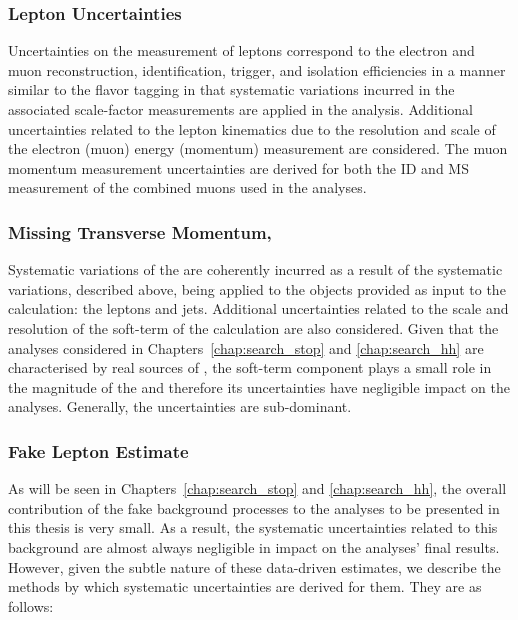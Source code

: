 \subsubsection{Lepton Uncertainties}
Uncertainties on the measurement of leptons correspond to the electron and muon reconstruction,
identification, trigger, and isolation efficiencies in a manner similar to the flavor tagging
in that systematic variations incurred in the associated scale-factor measurements are applied
in the analysis.
Additional uncertainties related to the lepton kinematics due to the resolution and scale of the
electron (muon) energy (momentum) measurement are considered.
The muon momentum measurement uncertainties are derived for both the ID and MS measurement
of the combined muons used in the analyses.

\subsubsection{Missing Transverse Momentum, \met}
Systematic variations of the \met are coherently incurred as a result of the
systematic variations, described above, being applied to the objects provided as input to the \met calculation:
the leptons and jets.
Additional uncertainties related to the scale and resolution of the soft-term of the \met calculation
are also considered.
Given that the analyses considered in Chapters~\ref{chap:search_stop} and \ref{chap:search_hh}
are characterised by real sources of \met, the soft-term component plays a small role in the magnitude
of the \met and therefore its uncertainties have negligible impact on the analyses.
Generally, the \met uncertainties are sub-dominant.

\subsubsection{Fake Lepton Estimate}

As will be seen in Chapters~\ref{chap:search_stop} and \ref{chap:search_hh}, the overall contribution
of the fake background processes to the analyses to be presented in this thesis is very small.
As a result, the systematic uncertainties related to this background are almost always negligible
in impact on the analyses' final results.
However, given the subtle nature of these data-driven estimates, we describe the methods by which
systematic uncertainties are derived for them.
They are as follows:

